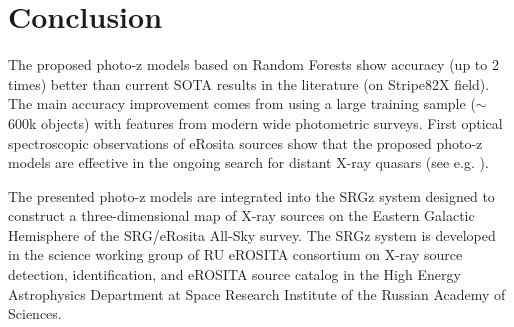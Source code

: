 \documentclass[fleqn,usenatbib]{mnras}
\begin{document}
\section{Conclusion}\label{sec:conclusion}



The proposed photo-z models based on Random Forests show accuracy (up to 2 times) better than current SOTA results in the literature (on Stripe82X field). The main accuracy improvement comes from using a large training sample ($\sim$600k objects) with features from modern wide photometric surveys. First optical spectroscopic observations of eRosita sources show that the proposed photo-z models are effective in the ongoing search for distant X-ray quasars (see e.g. \citep{2020MNRAS.497.1842M,2020AstL...46..149K,2020AstL...46..429D}).

The presented photo-z models are integrated into the SRGz system designed to construct a three-dimensional map of X-ray sources on the Eastern Galactic Hemisphere of the SRG/eRosita All-Sky survey. The SRGz system is developed in the science working group of RU eROSITA consortium on X-ray source detection, identification, and eROSITA source catalog in the High Energy Astrophysics Department at Space Research Institute of the Russian Academy of Sciences.

\end{document}

